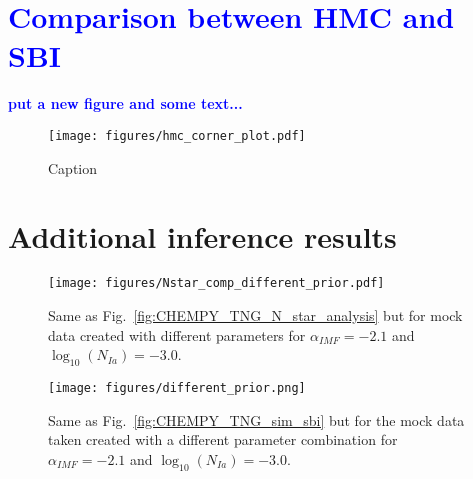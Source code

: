 \documentclass{aa}
\newcommand{\resub}[1]{\textbf{\textcolor{blue}{#1}}}
\begin{document}
\begin{appendix}
\section{\resub{Comparison between HMC and SBI}}
\label{sec:hmc-sbi}
\resub{put a new figure and some text...}

\begin{figure}
    \centering
    \texttt{[image: figures/hmc\_corner\_plot.pdf]}
    \vspace{-.5cm}
    \caption{Caption}
    \label{fig:hmc}
\end{figure}

\section{Additional inference results}
\label{sec: additional inference}

\begin{figure*}
    \centering
    \texttt{[image: figures/Nstar\_comp\_different\_prior.pdf]}
    \vspace{-.5cm}
    \caption{Same as Fig.~\ref{fig:CHEMPY_TNG_N_star_analysis} but for mock data created with different parameters for $\alpha_{IMF}=-2.1$ and $\log_{10}(N_{Ia})=-3.0$.}
    \label{fig:N_star_analysis_different_prior}
\end{figure*}

\begin{figure}
    \centering
    \texttt{[image: figures/different\_prior.png]}
    \vspace{-.25cm}
    \caption{Same as Fig.~\ref{fig:CHEMPY_TNG_sim_sbi} but for the mock data taken created with a different parameter combination for $\alpha_{IMF}=-2.1$ and $\log_{10}(N_{Ia})=-3.0$.}
    \label{fig:CHEMPY_different_prior_sbi} 
\end{figure}

\end{appendix}
\end{document}

